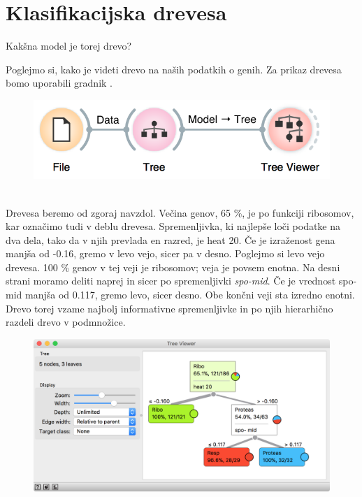 \chapter{Klasifikacijska drevesa}
\label{ch:drevesa}

 Kakšna model je torej drevo?

Poglejmo si, kako je videti drevo na naših podatkih o genih. Za prikaz drevesa bomo uporabili gradnik .

\begin{figure}[h]
    \includegraphics[width=0.8\linewidth]{workflow.png}
    \caption{$\;$}
\end{figure}

Drevesa beremo od zgoraj navzdol. Večina genov, 65 \%, je po funkciji ribosomov, kar označimo tudi v deblu drevesa. Spremenljivka, ki najlepše loči podatke na dva dela, tako da v njih prevlada en razred, je heat 20. Če je izraženost gena manjša od -0.16, gremo v levo vejo, sicer pa v desno. Poglejmo si levo vejo drevesa. 100 \% genov v tej veji je ribosomov; veja je povsem enotna. Na desni strani moramo deliti naprej in sicer po spremenljivki \textit{spo-mid}. Če je vrednost spo-mid manjša od 0.117, gremo levo, sicer desno. Obe končni veji sta izredno enotni. Drevo torej vzame najbolj informativne spremenljivke in po njih hierarhično razdeli drevo v podmnožice.

\begin{figure}[h]
    \centering
    \includegraphics[width=0.8\linewidth]{tree.png}%
    \caption{$\;$}
\end{figure}

